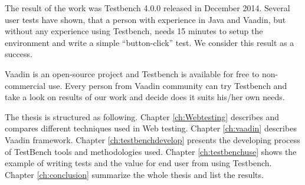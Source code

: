 	  The result of the work was Testbench 4.0.0 released in December 2014.
	  Several user tests have shown, that a person with experience in Java and
	  Vaadin, but without any experience using Testbench, needs 15 minutes to setup
	  the environment and write a simple ``button-click'' test. We consider this
	  result as a success.
	  
	  Vaadin is an open-source project and Testbench is available for free to
	  non-commercial use.  Every person from Vaadin community
	  can try Testbench and take a look on results of our work and
	  decide does it suits his/her own needs.
	  
	  \iffalse
		  I will also , because Testbench is focused on testing Web
		 applications written with Vaadin. I will also describe the working flow, what
		 tools and methodologies the team used and how the final product helps
		 Vaadin developers.
	  \fi

	  The thesis is structured as following. Chapter \ref{ch:Webtesting}
	  describes and compares different techniques used in Web testing.
	  Chapter \ref{ch:vaadin} describes Vaadin framework.
	  Chapter \ref{ch:testbenchdevelop} presents the developing process of
	  TestBench tools and methodologies used. Chapter \ref{ch:testbenchuse} shows the example of writing tests and the value for
	  end user from using Testbench. Chapter \ref{ch:conclusion} summarize the whole
	  thesis and list the results.